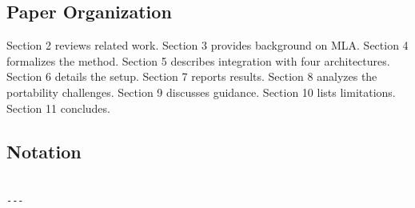 \subsection{Paper Organization}

Section 2 reviews related work. Section 3 provides background on MLA. Section 
4 formalizes the method. Section 5 describes integration with four 
architectures. Section 6 details the setup. Section 7 reports results. 
Section 8 analyzes the portability challenges. Section 9 discusses guidance. 
Section 10 lists limitations. Section 11 concludes.



\subsection{Notation}

\begin{lstlisting}

---
\end{lstlisting}